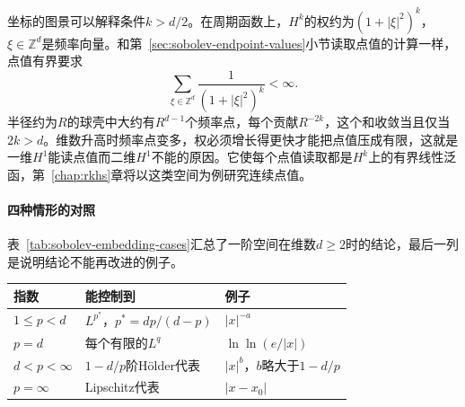 坐标的图景可以解释条件$k>d/2$。在周期函数上，$H^k$的权约为$(1+|\xi|^2)^k$，$\xi\in\mathbb Z^d$是频率向量。和第~\ref{sec:sobolev-endpoint-values}小节读取点值的计算一样，点值有界要求
\[
\sum_{\xi\in\mathbb Z^d}\frac1{(1+|\xi|^2)^k}<\infty .
\]
半径约为$R$的球壳中大约有$R^{d-1}$个频率点，每个贡献$R^{-2k}$，这个和收敛当且仅当$2k>d$。维数升高时频率点变多，权必须增长得更快才能把点值压成有限，这就是一维$H^1$能读点值而二维$H^1$不能的原因。它使每个点值读取都是$H^k$上的有界线性泛函，第~\ref{chap:rkhs}章将以这类空间为例研究连续点值。

\paragraph{四种情形的对照}
表~\ref{tab:sobolev-embedding-cases}汇总了一阶空间在维数$d\geq2$时的结论，最后一列是说明结论不能再改进的例子。

\begin{BookInlineTable}
  \centering
  \caption{$W^{1,p}$在有界Lipschitz区域上的连续嵌入（$d\geq2$）。}
  \label{tab:sobolev-embedding-cases}
  \begin{tabular}{lll}
    \toprule
    指数 & 能控制到 & 例子\\
    \midrule
    $1\leq p<d$ & $L^{p^*}$，$p^*=dp/(d-p)$ & $|x|^{-a}$\\
    $p=d$ & 每个有限的$L^q$ & $\ln\ln(e/|x|)$\\
    $d<p<\infty$ & $1-d/p$阶Hölder代表 & $|x|^b$，$b$略大于$1-d/p$\\
    $p=\infty$ & Lipschitz代表 & $|x-x_0|$\\
    \bottomrule
  \end{tabular}
\end{BookInlineTable}
